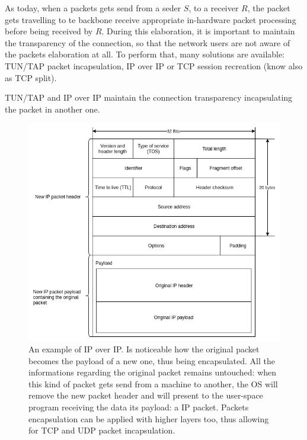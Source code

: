 \documentclass[10pt]{book}
\begin{document}
As today, when a packets gets send from a seder $S$, to a receiver $R$, the 
packet gets travelling to te backbone receive appropriate in-hardware packet 
processing before being received by $R$. During this elaboration, it is 
important to maintain the transparency of the connection, so that the network 
users are not aware of the packets elaboration at all. To perform that, many 
solutions are available: TUN/TAP packet incapsulation, IP over IP or TCP 
session recreation (know also as TCP split).

TUN/TAP and IP over IP maintain the connection transparency incapsulating the
packet in another one.
\begin{figure}[t]
  \centering
  \includegraphics[scale=0.5]{IPoverIP}
  \caption[IP over IP schema]{An example of IP over IP. Is noticeable how the
    original packet becomes the payload of a new one, thus being encapsulated.
    All the informations regarding the original packet remains untouched: when
    this kind of packet gets send from a machine to another, the OS will remove
    the new packet header and will present to the user-space program receiving
    the data its payload: a IP packet. Packets encapsulation can be applied with
    higher layers too, thus allowing for TCP and UDP packet incapsulation.}
  \label{chap:prjan:img:ip_over_ip}
\end{figure}
\end{document}
